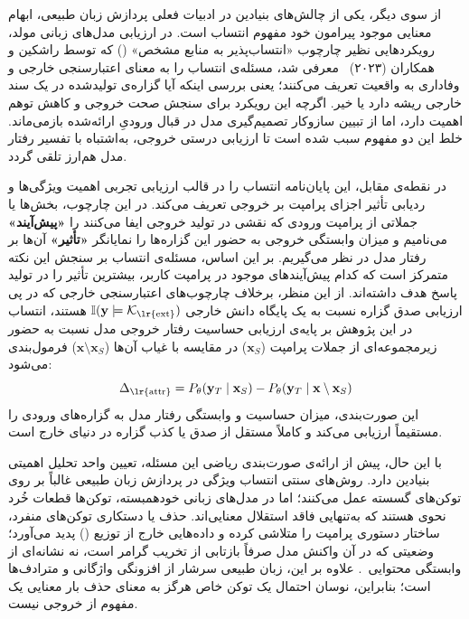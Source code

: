 از سوی دیگر، یکی از چالش‌های بنیادین در ادبیات فعلی پردازش زبان طبیعی، ابهام معنایی موجود پیرامون خود مفهوم انتساب است. در ارزیابی مدل‌های زبانی مولد، رویکردهایی نظیر چارچوب «انتساب‌پذیر به منابع مشخص» () که توسط راشکین و همکاران (۲۰۲۳)~\cite{rashkin2023measuring} معرفی شد، مسئله‌ی انتساب را به معنای اعتبارسنجی خارجی و وفاداری به واقعیت تعریف می‌کنند؛ یعنی بررسی اینکه آیا گزاره‌ی تولیدشده در یک سند خارجی ریشه دارد یا خیر. اگرچه این رویکرد برای سنجش صحت خروجی و کاهش توهم اهمیت دارد، اما از تبیین سازوکار تصمیم‌گیری مدل در قبال ورودیِ ارائه‌شده بازمی‌ماند. خلط این دو مفهوم سبب شده است تا ارزیابی درستی خروجی، به‌اشتباه با تفسیر رفتار مدل هم‌ارز تلقی گردد. 

در نقطه‌ی مقابل، این پایان‌نامه انتساب را در قالب ارزیابی تجربی اهمیت ویژگی‌ها و ردیابی تأثیر اجزای پرامپت بر خروجی تعریف می‌کند. در این چارچوب، بخش‌ها یا جملاتی از پرامپت ورودی که نقشی در تولید خروجی ایفا می‌کنند را \textbf{«پیش‌آیند»} می‌نامیم و میزان وابستگی خروجی به حضور این گزاره‌ها را نمایانگر \textbf{«تأثیر»} آن‌ها بر رفتار مدل در نظر می‌گیریم. بر این اساس، مسئله‌ی انتساب بر سنجش این نکته متمرکز است که کدام پیش‌آیندهای موجود در پرامپت کاربر، بیشترین تأثیر را در تولید پاسخ هدف داشته‌اند. از این منظر، برخلاف چارچوب‌های اعتبارسنجی خارجی که در پی ارزیابی صدق گزاره نسبت به یک پایگاه دانش خارجی $\mathbb{I}(\mathbf{y} \models \mathcal{K}_{\text{\lr{ext}}})$ هستند، انتساب در این پژوهش بر پایه‌ی ارزیابی حساسیت رفتار خروجی مدل نسبت به حضور زیرمجموعه‌ای از جملات پرامپت ($\mathbf{x}_S$) در مقایسه با غیاب آن‌ها ($\mathbf{x} \setminus \mathbf{x}_S$) فرمول‌بندی می‌شود:
\begin{equation}\label{eq:chap1_causal_interv}
    \Delta_{\text{\lr{attr}}} = P_\theta(\mathbf{y}_T \mid \mathbf{x}_S) - P_\theta(\mathbf{y}_T \mid \mathbf{x} \setminus \mathbf{x}_S)
\end{equation}
این صورت‌بندی، میزان حساسیت و وابستگی رفتار مدل به گزاره‌های ورودی را مستقیماً ارزیابی می‌کند و کاملاً مستقل از صدق یا کذب گزاره در دنیای خارج است.

با این حال، پیش از ارائه‌ی صورت‌بندی ریاضی این مسئله، تعیین واحد تحلیل اهمیتی بنیادین دارد. روش‌های سنتی انتساب ویژگی در پردازش زبان طبیعی غالباً بر روی توکن‌های گسسته عمل می‌کنند؛ اما در مدل‌های زبانی خودهمبسته، توکن‌ها قطعات خُرد نحوی هستند که به‌تنهایی فاقد استقلال معنایی‌اند. حذف یا دستکاری توکن‌های منفرد، ساختار دستوری پرامپت را متلاشی کرده و داده‌هایی خارج از توزیع () پدید می‌آورد؛ وضعیتی که در آن واکنش مدل صرفاً بازتابی از تخریب گرامر است، نه نشانه‌ای از وابستگی محتوایی~\cite{madsen2022evaluating}. علاوه بر این، زبان طبیعی سرشار از افزونگی واژگانی و مترادف‌ها است؛ بنابراین، نوسان احتمال یک توکن خاص هرگز به معنای حذف بار معنایی یک مفهوم از خروجی نیست. 

